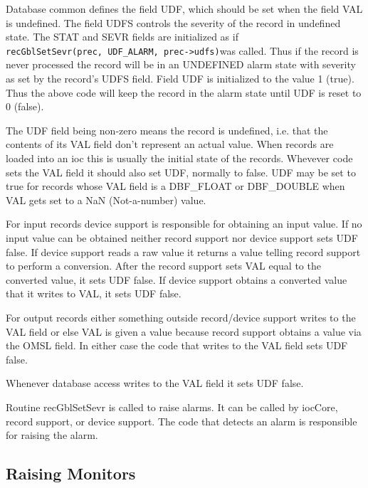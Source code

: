 Database common defines the field UDF, which should be set when the field VAL is undefined.
The field UDFS controls the severity of the record in undefined state.
The STAT and SEVR fields are initialized as if \\
\verb|recGblSetSevr(prec, UDF_ALARM, prec->udfs)|was called.
Thus if the record is never processed the record will be in an UNDEFINED alarm state with severity as set by the record's UDFS field.
Field UDF is initialized to the value 1 (true).
Thus the above code will keep the record in the alarm state until UDF is reset to 0 (false).

The UDF field being non-zero means the record is undefined, i.e. that the contents of its VAL field don't represent an actual value.
When records are loaded into an ioc this is usually the initial state of the records.
Whevever code sets the VAL field it should also set UDF, normally to false.
UDF may be set to true for records whose VAL field is a DBF\_FLOAT or DBF\_DOUBLE when VAL gets set to a NaN (Not-a-number) value.

For input records device support is responsible for obtaining an input value.
If no input value can be obtained neither record support nor device support sets UDF false.
If device support reads a raw value it returns a value telling record support to perform a conversion.
After the record support sets VAL equal to the converted value, it sets UDF false.
If device support obtains a converted value that it writes to VAL, it sets UDF false.

For output records either something outside record/device support writes to the VAL field or else VAL is given a value because record support obtains a value via the OMSL field.
In either case the code that writes to the VAL field sets UDF false.

Whenever database access writes to the VAL field it sets UDF false.

Routine recGblSetSevr is called to raise alarms.
It can be called by iocCore, record support, or device support.
The code that detects an alarm is responsible for raising the alarm.

\subsection{Raising Monitors}

